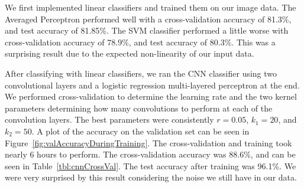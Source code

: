 We first implemented linear classifiers and trained them on our image data.  The Averaged Perceptron performed well with a cross-validation accuracy of 81.3\%, and test accuracy of 81.85\%.  The SVM classifier performed a little worse with cross-validation accuracy of 78.9\%, and test accuracy of 80.3\%.  This was a surprising result due to the expected non-linearity of our input data.

After classifying with linear classifiers, we ran the CNN classifier using two convolutional layers and a logistic regression multi-layered perceptron at the end.  We performed cross-validation to determine the learning rate and the two kernel parameters determining how many convolutions to perform at each of the convolution layers.  The best parameters were consistently $r = 0.05$, $k_1 = 20$, and $k_2 = 50$.  A plot of the accuracy on the validation set can be seen in Figure~\ref{fig:valAccuracyDuringTraining}.  The cross-validation and training took nearly 6 hours to perform.  The cross-validation accuracy was 88.6\%, and can be seen in Table~\ref{tbl:cnnCrossVal}.  The test accuracy after training was 96.1\%.  We were very surprised by this result considering the noise we still have in our data.

